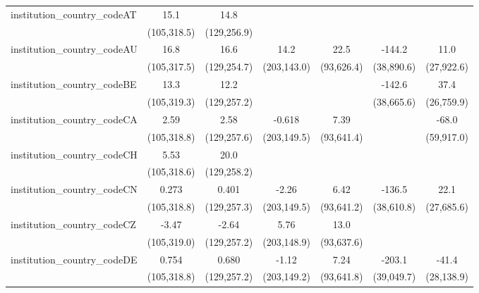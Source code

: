 \begin{tabular}{lcccccc}
   institution\_country\_codeAT          & 15.1          & 14.8          &               &               &              &   \\   
                                         & (105,318.5)   & (129,256.9)   &               &               &              &   \\   
   institution\_country\_codeAU          & 16.8          & 16.6          & 14.2          & 22.5          & -144.2       & 11.0\\   
                                         & (105,317.5)   & (129,254.7)   & (203,143.0)   & (93,626.4)    & (38,890.6)   & (27,922.6)\\   
   institution\_country\_codeBE          & 13.3          & 12.2          &               &               & -142.6       & 37.4\\   
                                         & (105,319.3)   & (129,257.2)   &               &               & (38,665.6)   & (26,759.9)\\   
   institution\_country\_codeCA          & 2.59          & 2.58          & -0.618        & 7.39          &              & -68.0\\   
                                         & (105,318.8)   & (129,257.6)   & (203,149.5)   & (93,641.4)    &              & (59,917.0)\\   
   institution\_country\_codeCH          & 5.53          & 20.0          &               &               &              &   \\   
                                         & (105,318.6)   & (129,258.2)   &               &               &              &   \\   
   institution\_country\_codeCN          & 0.273         & 0.401         & -2.26         & 6.42          & -136.5       & 22.1\\   
                                         & (105,318.8)   & (129,257.3)   & (203,149.5)   & (93,641.2)    & (38,610.8)   & (27,685.6)\\   
   institution\_country\_codeCZ          & -3.47         & -2.64         & 5.76          & 13.0          &              &   \\   
                                         & (105,319.0)   & (129,257.2)   & (203,148.9)   & (93,637.6)    &              &   \\   
   institution\_country\_codeDE          & 0.754         & 0.680         & -1.12         & 7.24          & -203.1       & -41.4\\   
                                         & (105,318.8)   & (129,257.2)   & (203,149.2)   & (93,641.8)    & (39,049.7)   & (28,138.9)\\   

\end{tabular}
